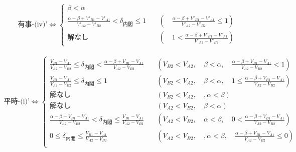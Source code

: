 \documentclass[main.tex]{subfiles}
\begin{document}
\begin{align*}
    \text{有事-(iv)'} \Leftrightarrow 
    \begin{cases}
        \beta < \alpha \\[1em]
        \frac{\alpha-\beta + V'_{B1}-V'_{A1}}{V'_{A2} - V'_{B2}} < \delta_{内閣} \le 1  \quad &(\quad \frac{\alpha-\beta + V'_{B1}-V'_{A1}}{V'_{A2} - V'_{B2}} \le 1 ) \\[1em]
        解なし   \quad &(\quad 1 < \frac{\alpha-\beta + V'_{B1}-V'_{A1}}{V'_{A2} - V'_{B2}} )
    \end{cases}
\end{align*}



\begin{align*}
    \text{平時-(i)'} \Leftrightarrow 
    \begin{cases}
        \frac{ V_{B1} - V_{A1} }{ V_{A2} - V_{B2} } \le \delta_{内閣} <  \frac{\alpha-\beta + V_{B1}-V_{A1}}{V_{A2} - V_{B2}} \quad &(V_{B2} < V_{A2},\quad \beta < \alpha, \quad \frac{\alpha-\beta + V_{B1}-V_{A1}}{V_{A2} - V_{B2}} < 1) \\[1em]
        \frac{ V_{B1} - V_{A1} }{ V_{A2} - V_{B2} } \le \delta_{内閣} \le 1 \quad &(V_{B2} < V_{A2},\quad \beta < \alpha, \quad 1 \le \frac{\alpha-\beta + V_{B1}-V_{A1}}{V_{A2} - V_{B2}}) \\[1em]
        解なし \quad &(V_{B2} < V_{A2},\quad, \alpha < \beta)\\[1em]
        解なし \quad &(V_{A2} < V_{B2},\quad \beta < \alpha) \\[1em]
        \frac{\alpha-\beta + V_{B1}-V_{A1}}{V_{A2} - V_{B2}} < \delta_{内閣} \le   \frac{ V_{B1} - V_{A1} }{ V_{A2} - V_{B2} } \quad &(V_{A2} < V_{B2},\quad \alpha < \beta, \quad  0 < \frac{\alpha-\beta + V_{B1}-V_{A1}}{V_{A2} - V_{B2}}) \\[1em]
        0 \le \delta_{内閣} \le  \frac{ V_{B1} - V_{A1} }{ V_{A2} - V_{B2} } \quad &(V_{A2} < V_{B2},\quad, \alpha < \beta,\quad \frac{\alpha-\beta + V_{B1}-V_{A1}}{V_{A2} - V_{B2}} \le 0)\\[1em]
    \end{cases}
\end{align*}
\end{document}
